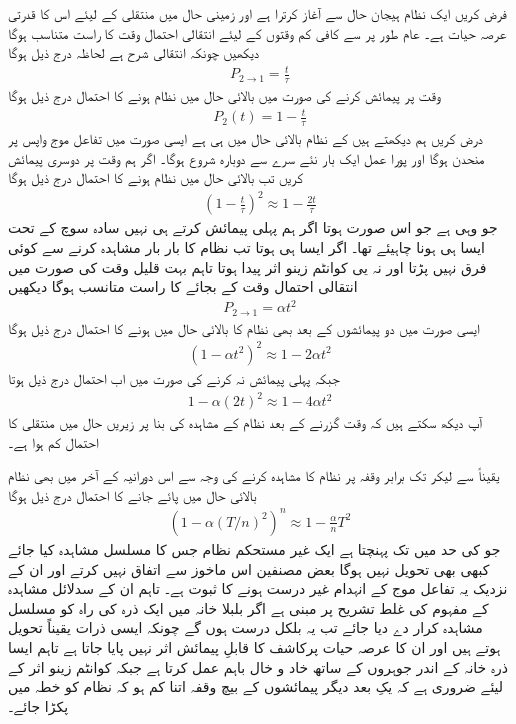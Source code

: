 فرض کریں ایک نظام ہیجان حال  سے آغاز کرترا ہے اور زمینی حال  میں منتقلی کے لیئے اس کا قدرتی عرصہ حیات  ہے۔ عام طور پر  سے کافی کم وقتوں کے لیئے انتقالی احتمال وقت  کا راست متناسب ہوگا  دیکھیں چونکہ انتقالی شرح  ہے لحاظہ درج ذیل ہوگا 
\begin{align}
	P_{2\to1}=\frac{t}{\tau}
\end{align}
وقت  پر پیمائش کرنے کی صورت میں بالائی حال میں نظام ہونے کا احتمال درج ذیل ہوگا
\begin{align}
	P_2(t)=1-\frac{t}{\tau}
\end{align}
درض کریں ہم دیکھتے ہیں کے نظام بالائی حال میں ہی ہے ایسی صورت میں تفاعل موج واپس  پر منحدن ہوگا اور پورا عمل ایک بار نئے سرے سے دوبارہ شروع ہوگا۔ اگر ہم وقت  پر دوسری پیمائش کریں تب بالائی حال میں نظام ہونے کا احتمال درج ذیل ہوگا 
\begin{align}
	\left(1-\frac{t}{\tau}\right)^2\approx1-\frac{2t}{\tau}
\end{align}
جو وہی ہے جو اس صورت ہوتا اگر ہم پہلی پیمائش کرتے ہی نہیں سادہ سوچ کے تحت ایسا ہی ہونا چاہیئے تھا۔ اگر ایسا ہی ہوتا تب نظام کا بار بار مشاہدہ کرنے سے کوئی فرق نہیں پڑتا اور نہ یی کوانٹم زینو اثر پیدا ہوتا تاہم بہت قلیل وقت کی صورت میں انتقالی احتمال وقت  کے بجائے  کا راست متانسب ہوگا  دیکھیں
\begin{align}
	P_{2\to1}=\alpha t^2
\end{align}
ایسی صورت میں دو پیمائشوں کے بعد بھی نظام کا بالائی حال میں ہونے کا احتمال درج ذیل ہوگا
\begin{align}
	\left(1-\alpha t^2\right)^2\approx 1-2\alpha t^2
\end{align}
جبکہ پہلی پیمائش نہ کرنے کی صورت میں اب احتمال درج ذیل ہوتا
\begin{align}
	1-\alpha(2t)^2\approx1-4\alpha t^2
\end{align}
آپ دیکھ سکتے ہیں کہ وقت  گزرنے کے بعد نظام کے مشاہدہ کی بنا پر زیریں حال میں منتقلی کا احتمال کم ہوا ہے۔

یقیناً  سے لیکر  تک  برابر وقفہ  پر نظام کا مشاہدہ کرنے کی وجہ سے اس دورانیہ کے آخر میں بھی نظام بالائی حال میں پائے جانے کا احتمال درج ذیل ہوگا
\begin{align}
	\left(1-\alpha(T/n)^2\right)^n\approx1-\frac{\alpha}{n}T^2
\end{align}
جو  کی حد میں  تک پہنچتا ہے ایک غیر مستحکم نظام جس کا مسلسل مشاہدہ کیا جائے کبھی بھی تحویل نہیں ہوگا بعض مصنفین اس ماخوز سے اتفاق نہیں کرتے اور ان کے نزدیک یہ تفاعل موج کے انہدام غیر درست ہونے کا ثبوت ہے۔ تاہم ان کے سدلائل مشاہدہ کے مفہوم کی غلط تشریح پر مبنی ہے اگر بلبلا خانہ میں ایک ذرہ کی راہ کو مسلسل مشاہدہ کرار دے دیا جائے تب یہ بلکل درست ہوں گے چونکہ ایسی ذرات یقیناً تحویل ہوتے ہیں اور ان کا عرصہ حیات پرکاشف کا قابلِ پیمائش اثر نہیں پایا جاتا ہے تاہم ایسا ذرہ خانہ کے اندر جوہروں کے ساتھ خاد و خال  باہم عمل کرتا ہے جبکہ کوانٹم زینو اثر کے لیئے ضروری ہے کہ یکِ بعد دیگر پیمائشوں کے بیچ وقفہ اتنا کم ہو کہ نظام کو  خطہ میں پکڑا جائے۔

